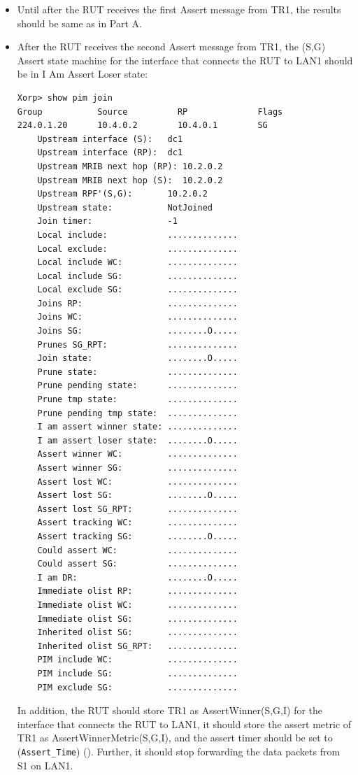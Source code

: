 \documentclass[11pt]{report}
\begin{document}
\begin{itemize}

  \item Until after the RUT receives the first Assert message from TR1, the
  results should be same as in Part A.

  \item After the RUT receives the second Assert message from TR1, the (S,G)
  Assert state machine for the interface that connects the RUT to LAN1 should
  be in I Am Assert Loser state:

\begin{verbatim}
Xorp> show pim join 
Group           Source          RP              Flags
224.0.1.20      10.4.0.2        10.4.0.1        SG   
    Upstream interface (S):   dc1
    Upstream interface (RP):  dc1
    Upstream MRIB next hop (RP): 10.2.0.2
    Upstream MRIB next hop (S):  10.2.0.2
    Upstream RPF'(S,G):       10.2.0.2
    Upstream state:           NotJoined 
    Join timer:               -1
    Local include:            ..............
    Local exclude:            ..............
    Local include WC:         ..............
    Local include SG:         ..............
    Local exclude SG:         ..............
    Joins RP:                 ..............
    Joins WC:                 ..............
    Joins SG:                 ........O.....
    Prunes SG_RPT:            ..............
    Join state:               ........O.....
    Prune state:              ..............
    Prune pending state:      ..............
    Prune tmp state:          ..............
    Prune pending tmp state:  ..............
    I am assert winner state: ..............
    I am assert loser state:  ........O.....
    Assert winner WC:         ..............
    Assert winner SG:         ..............
    Assert lost WC:           ..............
    Assert lost SG:           ........O.....
    Assert lost SG_RPT:       ..............
    Assert tracking WC:       ..............
    Assert tracking SG:       ........O.....
    Could assert WC:          ..............
    Could assert SG:          ..............
    I am DR:                  ........O.....
    Immediate olist RP:       ..............
    Immediate olist WC:       ..............
    Immediate olist SG:       ..............
    Inherited olist SG:       ..............
    Inherited olist SG_RPT:   ..............
    PIM include WC:           ..............
    PIM include SG:           ..............
    PIM exclude SG:           ..............
\end{verbatim}

  In addition, the RUT should store TR1 as AssertWinner(S,G,I) for the
  interface that connects the RUT to LAN1, it should store the assert metric
  of TR1 as AssertWinnerMetric(S,G,I), and the assert timer should be set to
  (\verb=Assert_Time=) ({\PimsmAssertTime}).
  Further, it should stop forwarding the data packets from S1 on LAN1.

\end{itemize}
\end{document}
